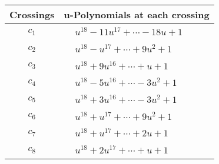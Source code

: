 \documentclass[1p]{elsarticle_modified}
\theoremstyle{definition}
\begin{document}
\begin{tabular}{m{50pt}|m{274pt}}
Crossings & \hspace{64pt}u-Polynomials at each crossing \\
\hline $$\begin{aligned}c_{1}\end{aligned}$$&$\begin{aligned}
&u^{18}-11 u^{17}+\cdots-18 u+1
\end{aligned}$\\
\hline $$\begin{aligned}c_{2}\end{aligned}$$&$\begin{aligned}
&u^{18}- u^{17}+\cdots+9 u^2+1
\end{aligned}$\\
\hline $$\begin{aligned}c_{3}\end{aligned}$$&$\begin{aligned}
&u^{18}+9 u^{16}+\cdots+u+1
\end{aligned}$\\
\hline $$\begin{aligned}c_{4}\end{aligned}$$&$\begin{aligned}
&u^{18}-5 u^{16}+\cdots-3 u^2+1
\end{aligned}$\\
\hline $$\begin{aligned}c_{5}\end{aligned}$$&$\begin{aligned}
&u^{18}+3 u^{16}+\cdots-3 u^2+1
\end{aligned}$\\
\hline $$\begin{aligned}c_{6}\end{aligned}$$&$\begin{aligned}
&u^{18}+u^{17}+\cdots+9 u^2+1
\end{aligned}$\\
\hline $$\begin{aligned}c_{7}\end{aligned}$$&$\begin{aligned}
&u^{18}+u^{17}+\cdots+2 u+1
\end{aligned}$\\
\hline $$\begin{aligned}c_{8}\end{aligned}$$&$\begin{aligned}
&u^{18}+2 u^{17}+\cdots+u+1
\end{aligned}$\\

\end{tabular}
\end{document}
